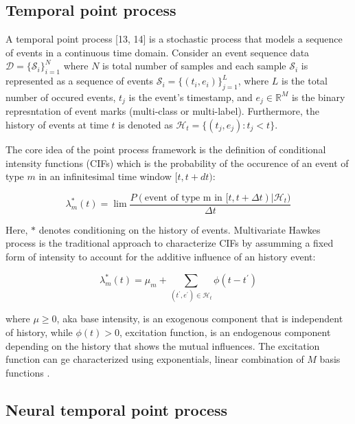 \documentclass[journal,twoside,web]{ieeecolor}
\begin{document}
\subsection{Temporal point process}


A temporal point process [13, 14] is a stochastic process that models a sequence of events in a continuous time domain. Consider an event sequence data  $\mathcal{D}=\{\mathcal{S}_{i}\}_{i=1}^N$ where $N$ is total number of samples and each sample $\mathcal{S}_{i}$ is represented as a sequence of events $\mathcal{S}_{i}=\{(t_i,e_i)\}_{j=1}^L$, where $L$ is the total number of occured events, $t_j$ is the event's timestamp, and $e_j \in \mathbb{R}^M $ is the binary represntation of event marks (multi-class or multi-label). Furthermore, the history of events at time $t$ is denoted as $\mathcal{H}_t=\{(t_j,e_j):t_j<t \}$.

The core idea of the point process framework is the definition of conditional intensity functions (CIFs) which is the probability of the occurence of an event of type $m$ in an infinitesimal time window $[t,t+dt)$:

\begin{equation} 
   \lambda_m^{*}(t)=\lim \frac{P(  \text{event of type m in } [t,t+\Delta t) |   \mathcal{H}_t  )}{\Delta t} 
\end{equation} 

Here, $*$ denotes conditioning on the history of events. Multivariate Hawkes process is the traditional approach to characterize CIFs by assumming a fixed form of intensity to account for the additive influence of an history event:

\begin{equation} 
    \lambda_m^{*}(t)= \mu_m + \sum_{(t^{\prime},e^{\prime})\in \mathcal{H}_t} \phi(t-t^{\prime})
 \end{equation} 

 where $\mu \ge 0 $, aka base intensity, is an exogenous component that is independent of history, while $\phi(t)>0$, excitation function, is an endogenous component depending on the history that shows the mutual influences. The excitation function can ge characterized using exponentials, linear combination of $M$ basis functions \cite*{xuLearningGrangerCausality2016}.

\subsection{Neural temporal point process}
\end{document}
